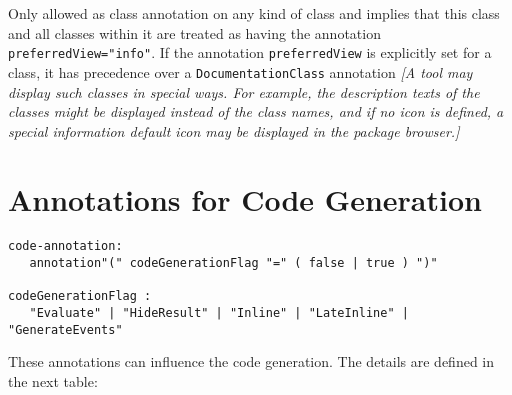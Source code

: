 Only allowed as class annotation on any kind of class and implies that
this class and all classes within it are treated as having the
annotation \lstinline!preferredView="info"!. If the annotation \lstinline!preferredView! is
explicitly set for a class, it has precedence over a \lstinline!DocumentationClass!
annotation \emph{{[}A tool may display such classes in special ways. For
example, the description texts of the classes might be displayed instead
of the class names, and if no icon is defined, a special information
default icon may be displayed in the package browser.{]}}

\section{Annotations for Code Generation}
\begin{lstlisting}[language=grammar]
code-annotation:
   annotation"(" codeGenerationFlag "=" ( false | true ) ")"

codeGenerationFlag :
   "Evaluate" | "HideResult" | "Inline" | "LateInline" | "GenerateEvents"
\end{lstlisting}
These annotations can influence the code generation. The details are
defined in the next table:

